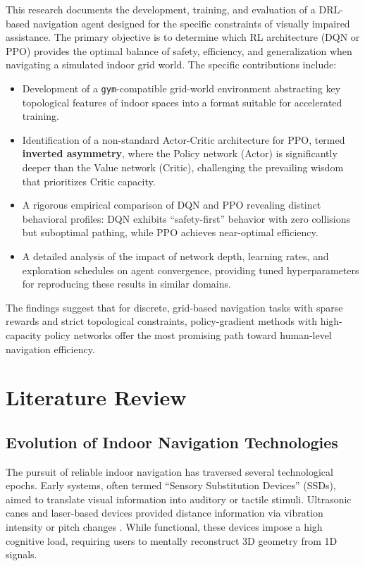 \documentclass{article}
\begin{document}
This research documents the development, training, and evaluation of a
DRL-based navigation agent designed for the specific constraints of visually
impaired assistance. The primary objective is to determine which RL architecture
(DQN or PPO) provides the optimal balance of safety, efficiency, and
generalization when navigating a simulated indoor grid world. The specific
contributions include:
\begin{itemize}
    \item Development of a \texttt{gym}-compatible grid-world environment
    abstracting key topological features of indoor spaces into a format suitable
    for accelerated training.
    \item Identification of a non-standard Actor-Critic architecture for PPO,
    termed \textbf{inverted asymmetry}, where the Policy network (Actor) is
    significantly deeper than the Value network (Critic), challenging the
    prevailing wisdom that prioritizes Critic capacity.
    \item A rigorous empirical comparison of DQN and PPO revealing distinct
    behavioral profiles: DQN exhibits ``safety-first'' behavior with zero
    collisions but suboptimal pathing, while PPO achieves near-optimal efficiency.
    \item A detailed analysis of the impact of network depth, learning rates,
    and exploration schedules on agent convergence, providing tuned
    hyperparameters for reproducing these results in similar domains.
\end{itemize}
The findings suggest that for discrete, grid-based navigation tasks with sparse
rewards and strict topological constraints, policy-gradient methods with
high-capacity policy networks offer the most promising path toward human-level
navigation efficiency.

\section{Literature Review}

\subsection{Evolution of Indoor Navigation Technologies}

The pursuit of reliable indoor navigation has traversed several technological
epochs. Early systems, often termed ``Sensory Substitution Devices'' (SSDs),
aimed to translate visual information into auditory or tactile stimuli. Ultrasonic
canes and laser-based devices provided distance information via vibration
intensity or pitch changes \cite{plikynas2020}. While functional, these devices
impose a high cognitive load, requiring users to mentally reconstruct 3D geometry
from 1D signals.
\end{document}
